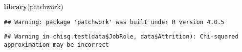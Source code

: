 \documentclass[
]{article}
\newenvironment{Shaded}{\begin{snugshade}}{\end{snugshade}}
\newcommand{\KeywordTok}[1]{\textcolor[rgb]{0.13,0.29,0.53}{\textbf{#1}}}
\newcommand{\NormalTok}[1]{#1}
\newcommand{\OperatorTok}[1]{\textcolor[rgb]{0.81,0.36,0.00}{\textbf{#1}}}
\newcommand{\StringTok}[1]{\textcolor[rgb]{0.31,0.60,0.02}{#1}}
\begin{document}
\begin{Shaded}
\begin{Highlighting}[]
\KeywordTok{library}\NormalTok{(patchwork)}
\end{Highlighting}
\end{Shaded}

\begin{verbatim}
## Warning: package 'patchwork' was built under R version 4.0.5
\end{verbatim}

\begin{Shaded}
\end{Shaded}

\begin{verbatim}
## Warning in chisq.test(data$JobRole, data$Attrition): Chi-squared approximation may be incorrect
\end{verbatim}
\end{document}
